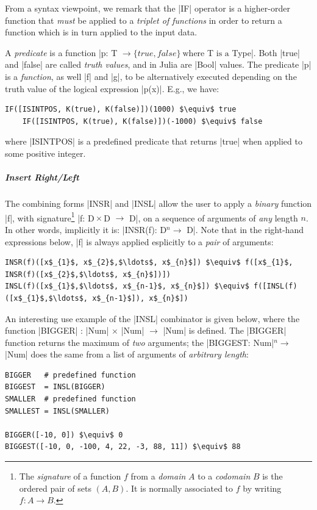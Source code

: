 From a syntax viewpoint, we remark that the |IF| operator is
a higher-order function that \emph{must} be applied to a
\emph{triplet of functions} in order to return a function which is in
turn applied to the input data.

A \emph{predicate} is a
function |p: T $\to \{true,
false\}\ \mbox{where}$ T $\mbox{is a}$ Type|.  Both
|true| and |false| are called \emph{truth values}, and
in Julia are |Bool| values. The predicate |p| is a \emph{function}, as well |f| and |g|,
to be alternatively executed depending on the truth value of the logical
expression |p(x)|.  E.g., we have:
\begin{lstlisting}[language=JuliaLocal, style=julia, mathescape = true]
    IF([ISINTPOS, K(true), K(false)])(1000) $\equiv$ true
    IF([ISINTPOS, K(true), K(false)])(-1000) $\equiv$ false
\end{lstlisting}
where |ISINTPOS| is a predefined predicate that returns |true| 
when applied to some positive integer. 


\subparagraph{Insert Right/Left}
The combining forms |INSR| and |INSL| allow the user to apply
a \emph{binary} function |f|, with signature\footnote{The \emph{signature}
of a function $f$ from a \emph{domain} $A$ to a \emph{codomain} $B$ is
the ordered pair of sets $(A,B)$.  It is normally associated to $f$ by
writing $f : A \rightarrow B$.} |f: D${}\times{}$D $\to$ D|, on a sequence
of arguments of \emph{any} length $n$. In other words, implicitly it is: |INSR(f): D$^n\to$ D|. Note that in the right-hand 
expressions below, |f| is always applied esplicitly  to a \emph{pair} of arguments:
\begin{lstlisting}[language=JuliaLocal, style=julia, mathescape = true] 
INSR(f)([x$_{1}$, x$_{2}$,$\ldots$, x$_{n}$]) $\equiv$ f([x$_{1}$, INSR(f)([x$_{2}$,$\ldots$, x$_{n}$])]) 
INSL(f)([x$_{1}$,$\ldots$, x$_{n-1}$, x$_{n}$]) $\equiv$ f([INSL(f)([x$_{1}$,$\ldots$, x$_{n-1}$]), x$_{n}$])
\end{lstlisting}

An interesting use example of the |INSL| combinator is given
below, where the function |BIGGER| : |Num| $\times$
|Num| $\to$ |Num| is defined.  The
|BIGGER| function returns the maximum of \emph{two} arguments; 
the |BIGGEST: Num|$^n \to$ |Num|  does the same from a list
of arguments of \emph{arbitrary length}:
\begin{lstlisting}[language=JuliaLocal, style=julia, mathescape = true] 
BIGGER   # predefined function
BIGGEST  = INSL(BIGGER)
SMALLER  # predefined function
SMALLEST = INSL(SMALLER)

BIGGER([-10, 0]) $\equiv$ 0 
BIGGEST([-10, 0, -100, 4, 22, -3, 88, 11]) $\equiv$ 88
\end{lstlisting}



